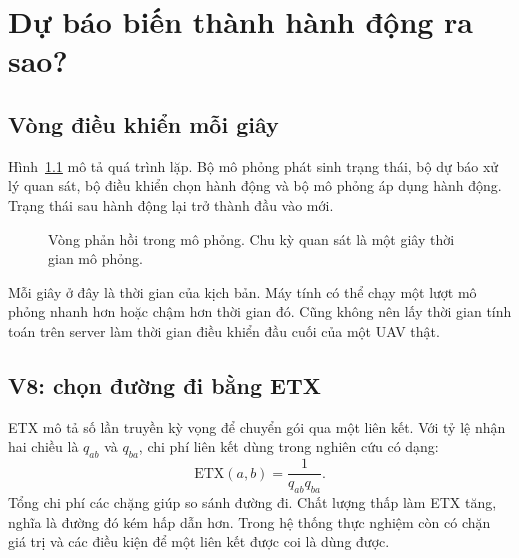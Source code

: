 \chapter{Dự báo biến thành hành động ra sao?}
\section{Vòng điều khiển mỗi giây}
Hình~\ref{fig:loop} mô tả quá trình lặp. Bộ mô phỏng phát sinh trạng thái, bộ dự báo xử lý quan sát, bộ điều khiển chọn hành động và bộ mô phỏng áp dụng hành động. Trạng thái sau hành động lại trở thành đầu vào mới.

\begin{figure}[htbp]
\centering
{}
\caption{Vòng phản hồi trong mô phỏng. Chu kỳ quan sát là một giây thời gian mô phỏng.}\label{fig:loop}
\end{figure}

Mỗi giây ở đây là thời gian của kịch bản. Máy tính có thể chạy một lượt mô phỏng nhanh hơn hoặc chậm hơn thời gian đó. Cũng không nên lấy thời gian tính toán trên server làm thời gian điều khiển đầu cuối của một UAV thật.

\section{V8: chọn đường đi bằng ETX}
ETX mô tả số lần truyền kỳ vọng để chuyển gói qua một liên kết. Với tỷ lệ nhận hai chiều là $q_{ab}$ và $q_{ba}$, chi phí liên kết dùng trong nghiên cứu có dạng:
\[
\mathrm{ETX}(a,b)=\frac{1}{q_{ab}q_{ba}}.
\]
Tổng chi phí các chặng giúp so sánh đường đi. Chất lượng thấp làm ETX tăng, nghĩa là đường đó kém hấp dẫn hơn. Trong hệ thống thực nghiệm còn có chặn giá trị và các điều kiện để một liên kết được coi là dùng được.


